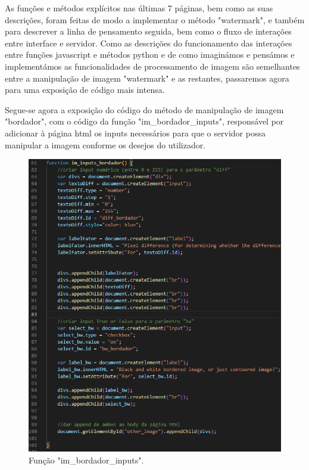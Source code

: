 \documentclass{report}
\begin{document}
    As funções e métodos explícitos nas últimas 7 páginas, bem como as suas descrições, foram feitas de modo a implementar o método "watermark", e também para descrever a linha de pensamento seguida, bem como o fluxo de interações entre interface e servidor.
\linebreak
 \bigskip
 Como as descrições do funcionamento das interações entre funções javascript e métodos python e de como imaginámos e pensámos e implementámos as funcionalidades de processamento de imagem são semelhantes entre a manipulação de imagem "watermark" e as restantes, passaremos agora para uma exposição de código mais intensa.

\linebreak
 \bigskip
 Segue-se agora a exposição do código do método de manipulação de imagem "bordador", com o código da função "im\_bordador\_inputs", responsável por adicionar à página html os inputs necessários para que o servidor possa manipular a imagem conforme os desejos do utilizador.


\begin{figure}[!hbtp]
        \centering
        \includegraphics[scale=0.5]{Images_code/13 - image manipulation js bordador im_inputs_bordador.png}
        \caption{\label{Estrutura}Função "im\_bordador\_inputs".}
\end{figure}
\end{document}
